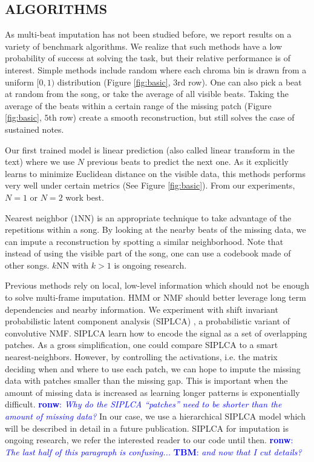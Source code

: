 \documentclass{article}
\newcommand{\FIXME}[2][FIXME]{\textcolor{blue}{\textbf{#1}: \emph{#2}}}
\begin{document}
\subsection{ALGORITHMS}
\label{ssec:algo}
As multi-beat imputation has not been studied before, we report
results on a variety of benchmark algorithms. We realize that such
methods have a low probability of success at solving the task, but
their relative performance is of interest.  Simple methods include
random where each chroma bin is drawn from a uniform $[0,1)$
distribution (Figure \ref{fig:basic}, $3$rd row).  One can also pick a
beat at random from the song, or take the average of all visible
beats. Taking the average of the beats within a certain range
of the missing patch (Figure \ref{fig:basic}, $5$th row) create a
smooth reconstruction, but still solves the case of sustained notes.

Our first trained model is linear prediction (also called linear
transform in the text) where we use $N$ previous beats to predict the
next one.  As it explicitly learns to minimize Euclidean distance on
the visible data, this methods performs very well under certain
metrics (See Figure \ref{fig:basic}). From our experiments, $N=1$ or
$N=2$ work best.

Nearest neighbor ($1$NN) is an appropriate technique
to take advantage of the repetitions within a song. By looking at the
nearby beats of the missing data, we can impute a reconstruction by
spotting a similar neighborhood. Note that instead of using the
visible part of the song, one can use a codebook made of
other songs.  $k$NN with $k>1$ is ongoing research.

Previous methods rely on local, low-level information which should not
be enough to solve multi-frame imputation. HMM or NMF should better
leverage long term dependencies and nearby information.  We experiment
with shift invariant probabilistic latent component analysis (SIPLCA)
\cite{Smaragdis2009,Weiss2010}, a probabilistic variant of convolutive
NMF. SIPLCA learn how to encode the signal as a set of overlapping
patches. 
As a gross simplification, one
could compare SIPLCA to a smart nearest-neighbors. However, by
controlling the activations, i.e. the matrix deciding when and where
to use each patch, we can hope to impute the missing data with patches
smaller than the missing gap. This is important when the amount of
missing data is increased as learning longer patterns is exponentially
difficult.  
\FIXME[ronw]{Why do the SIPLCA ``patches'' need to be
  shorter than the amount of missing data?}  
In our case, we use a
hierarchical SIPLCA model which will be described in detail in a
future publication.  SIPLCA for imputation is ongoing research, we
refer the interested reader to our code until then.  
\FIXME[ronw]{The last half of this paragraph is confusing...}  
\FIXME[TBM]{and now that I cut details?} 
\end{document}
